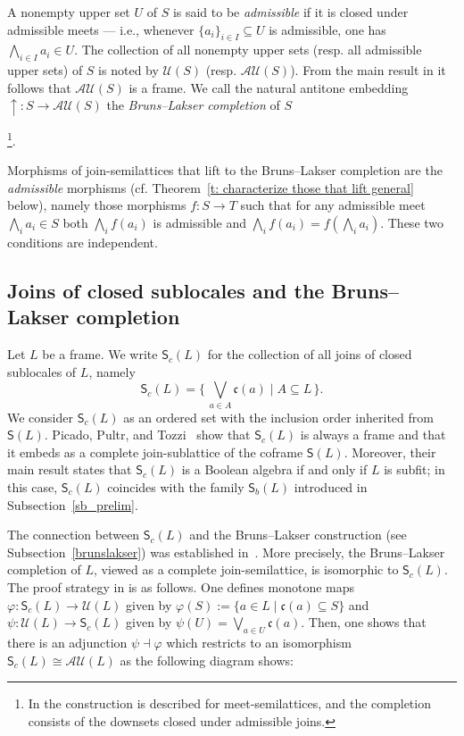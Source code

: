 \documentclass[11pt,a4paper,reqno]{amsart}
\newcommand{\bigset}[1]{\bigl\{\,#1\,\bigr\}}
\newcommand{\tbigwedge}{\mathop{\textstyle \bigwedge }}%
\newcommand{\tbigvee}{\mathop{\textstyle \bigvee }}%
\def\SS{\mathsf{S}}
\def\cl{\mathfrak{c}}
\theoremstyle{definition}
\theoremstyle{remark}
\newcommand{\ca}[1]{\mathcal{#1}}
\begin{document}
A nonempty upper set $U$ of $S$ is said to be \emph{admissible} if it is closed under admissible meets --- i.e., whenever $\{a_i\}_{i\in I}\subseteq U$ is admissible, one has $\tbigwedge_{i\in I}a_i\in U$. The collection of all nonempty upper sets (resp. all admissible upper sets) of $S$ is noted by $\mathcal{U}(S)$ (resp. $\mathcal{AU}(S)$). From the main result in \cite{BrunsLakser1970} it follows that  $\mathcal{AU}(S)$ is a frame.  We call the natural antitone embedding  $\uparrow\colon S\to \mathcal{AU}(S)$ the \emph{Bruns--Lakser completion} of $S${\footnote{ In \cite{BrunsLakser1970} the construction is described for meet-semilattices, and the completion consists of the downsets closed under admissible joins.}.

Morphisms of join-semilattices that lift to the Bruns--Lakser completion are the \emph{admissible} morphisms (cf. Theorem~\ref{t: characterize those that lift general} below), namely those morphisms $f:S\to T$ such that for any admissible meet $\bigwedge_i a_i\in S$ both $\bigwedge_i f(a_i)$ is admissible and $\bigwedge_i f(a_i)=f(\bigwedge_i a_i)$. These two conditions are independent. 

 \subsection{Joins of closed sublocales and the Bruns--Lakser completion}\label{scl.BL}

Let $L$ be a frame. We write $\SS_c(L)$ for the collection of all joins of closed sublocales of $L$, namely
\[
\SS_c(L)=\bigset{ \tbigvee_{a\in A} \cl(a)\mid A \subseteq L}.
\]
We consider $\SS_c(L)$ as an ordered set with the inclusion order inherited from $\SS(L)$.  
Picado, Pultr, and Tozzi~\cite{PicadoPultrTozzi2019} show that $\SS_c(L)$ is always a frame and that it embeds as a complete join-sublattice of the coframe $\SS(L)$. Moreover, their main result states that $\SS_c(L)$ is a Boolean algebra if and only if $L$ is subfit; in this case, $\SS_c(L)$ coincides with the family $\SS_b(L)$ introduced in Subsection~\ref{sb_prelim}.  

The connection between $\SS_c(L)$ and the Bruns--Lakser construction (see Subsection~\ref{brunslakser}) was established in~\cite{ballmoshierpultr}. More precisely,  the Bruns--Lakser completion of $L$, viewed as a complete join-semilattice, is isomorphic to $\SS_c(L)$.  The proof strategy in \cite{ballmoshierpultr} is as follows. One defines monotone maps $\varphi\colon \SS_c(L)\to \mathcal{U}(L)$ given by $\varphi(S):=\{a\in L\mid \cl(a)\subseteq S\}$ and $\psi\colon \mathcal{U}(L)\to \SS_c(L)$ given by $\psi(U)= \tbigvee_{a\in U}\cl(a)$.
Then, one shows that there is an adjunction $\psi\dashv
 \varphi$ which restricts to an isomorphism $\SS_c(L)\cong \ca{AU}(L)$ as the following diagram shows:
 
}
\end{document}
